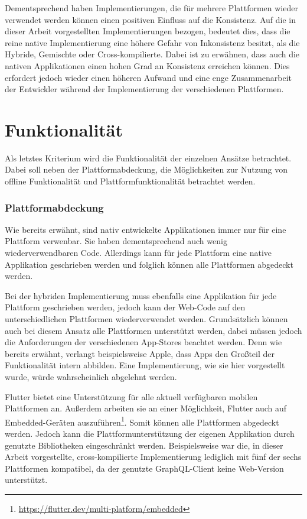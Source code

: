 Dementsprechend haben Implementierungen, die für mehrere Plattformen wieder verwendet werden können einen positiven Einfluss auf die Konsistenz.
Auf die in dieser Arbeit vorgestellten Implementierungen bezogen, bedeutet dies, dass die reine native Implementierung eine höhere Gefahr von Inkonsistenz besitzt, als die Hybride, Gemischte oder Cross-kompilierte.
Dabei ist zu erwähnen, dass auch die nativen Applikationen einen hohen Grad an Konsistenz erreichen können. Dies erfordert jedoch wieder einen höheren Aufwand und eine enge Zusammenarbeit der Entwickler während der Implementierung der verschiedenen Plattformen.

\section{Funktionalität}
Als letztes Kriterium wird die Funktionalität der einzelnen Ansätze betrachtet. Dabei soll neben der Plattformabdeckung, die Möglichkeiten zur Nutzung von offline Funktionalität und Plattformfunktionalität betrachtet werden.

\subsubsection{Plattformabdeckung}
Wie bereits erwähnt, sind nativ entwickelte Applikationen immer nur für eine Plattform verwenbar. Sie haben dementsprechend auch wenig wiederverwendbaren Code. Allerdings kann für jede Plattform eine native Applikation geschrieben werden und folglich können alle Plattformen abgedeckt werden.

Bei der hybriden Implementierung muss ebenfalls eine Applikation für jede Plattform geschrieben werden, jedoch kann der Web-Code auf den unterschiedlichen Plattformen wiederverwendet werden. Grundsätzlich können auch bei diesem Ansatz alle Plattformen unterstützt werden, dabei müssen jedoch die Anforderungen der verschiedenen App-Stores beachtet werden. Denn wie bereits erwähnt, verlangt beispielsweise Apple, dass Apps den Großteil der Funktionalität intern abbilden. Eine Implementierung, wie sie hier vorgestellt wurde, würde wahrscheinlich abgelehnt werden.

Flutter bietet eine Unterstützung für alle aktuell verfügbaren mobilen Plattformen an. Außerdem arbeiten sie an einer Möglichkeit, Flutter auch auf Embedded-Geräten auszuführen\footnote{\url{https://flutter.dev/multi-platform/embedded}}.
Somit können alle Plattformen abgedeckt werden. Jedoch kann die Plattformunterstützung der eigenen Applikation durch genutzte Bibliotheken eingeschränkt werden. Beispielsweise war die, in dieser Arbeit vorgestellte, cross-kompilierte Implementierung lediglich mit fünf der sechs Plattformen kompatibel, da der genutzte GraphQL-Client keine Web-Version unterstützt.

